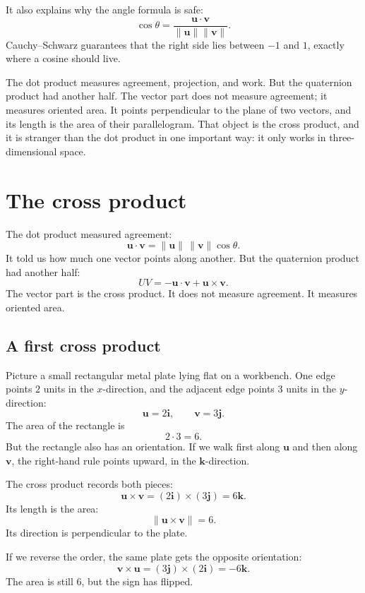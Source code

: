 It also explains why the angle formula is safe:
\[
    \cos\theta
    =
    \frac{\mathbf u\cdot\mathbf v}{\|\mathbf u\|\|\mathbf v\|}.
\]
Cauchy--Schwarz guarantees that the right side lies between \(-1\) and \(1\), exactly
where a cosine should live.

The dot product measures agreement, projection, and work.  But the quaternion
product had another half.  The vector part does not measure agreement; it measures
oriented area.  It points perpendicular to the plane of two vectors, and its length is the
area of their parallelogram.  That object is the cross product, and it is stranger than
the dot product in one important way: it only works in three-dimensional space.
\section{The cross product}

The dot product measured agreement:
\[
    \mathbf u\cdot\mathbf v
    =
    \|\mathbf u\|\,\|\mathbf v\|\cos\theta.
\]
It told us how much one vector points along another.  But the quaternion product had
another half:
\[
    UV=-\mathbf u\cdot\mathbf v+\mathbf u\times\mathbf v.
\]
The vector part is the cross product.  It does not measure agreement.  It measures
oriented area.

\subsection{A first cross product}

Picture a small rectangular metal plate lying flat on a workbench.  One edge points
\(2\) units in the \(x\)-direction, and the adjacent edge points \(3\) units in the
\(y\)-direction:
\[
    \mathbf u=2\mathbf i,
    \qquad
    \mathbf v=3\mathbf j.
\]
The area of the rectangle is
\[
    2\cdot 3=6.
\]
But the rectangle also has an orientation.  If we walk first along \(\mathbf u\) and then
along \(\mathbf v\), the right-hand rule points upward, in the \(\mathbf k\)-direction.

The cross product records both pieces:
\[
    \mathbf u\times\mathbf v
    =
    (2\mathbf i)\times(3\mathbf j)
    =
    6\mathbf k.
\]
Its length is the area:
\[
    \|\mathbf u\times\mathbf v\|=6.
\]
Its direction is perpendicular to the plate.

If we reverse the order, the same plate gets the opposite orientation:
\[
    \mathbf v\times\mathbf u
    =
    (3\mathbf j)\times(2\mathbf i)
    =
    -6\mathbf k.
\]
The area is still \(6\), but the sign has flipped.

